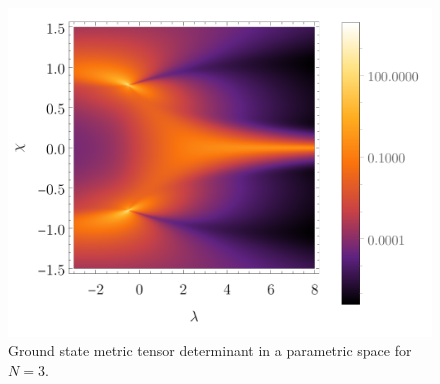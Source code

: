 \begin{figure}[H]
    \centering
    \includegraphics[scale=1.3]{../img/N=3_gDivergence.pdf}
    \caption{Ground state metric tensor determinant in a parametric space for $N=3$.}
    \label{fig:N=3_gDivenrgence}    
\end{figure}


